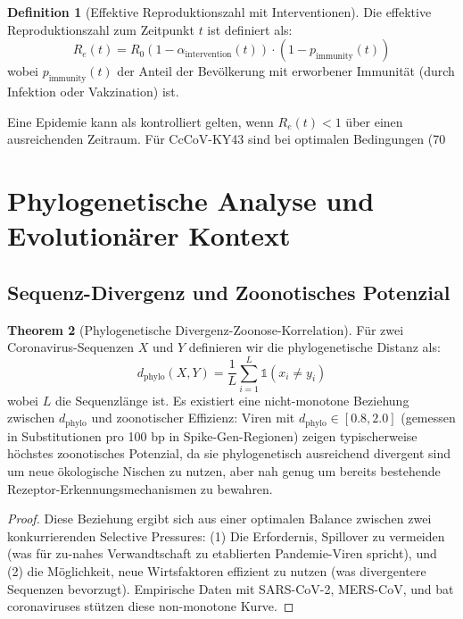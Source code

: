 \documentclass[11pt,a4paper]{article}
\theoremstyle{definition}
\newtheorem{theorem}{Theorem}[section]
\newtheorem{definition}[theorem]{Definition}
\begin{document}
\begin{definition}[Effektive Reproduktionszahl mit Interventionen]
Die effektive Reproduktionszahl zum Zeitpunkt $t$ ist definiert als:
\[
R_e(t) = R_0 (1 - \alpha_{\text{intervention}}(t)) \cdot (1 - p_{\text{immunity}}(t))
\]
wobei $p_{\text{immunity}}(t)$ der Anteil der Bevölkerung mit erworbener Immunität (durch Infektion oder Vakzination) ist.
\end{definition}

Eine Epidemie kann als kontrolliert gelten, wenn $R_e(t) < 1$ über einen ausreichenden Zeitraum. Für CcCoV-KY43 sind bei optimalen Bedingungen (70%

\section{Phylogenetische Analyse und Evolutionärer Kontext}

\subsection{Sequenz-Divergenz und Zoonotisches Potenzial}

\begin{theorem}[Phylogenetische Divergenz-Zoonose-Korrelation]
\label{thm:phylo_zoonosis}
Für zwei Coronavirus-Sequenzen $X$ und $Y$ definieren wir die phylogenetische Distanz als:
\[
d_{\text{phylo}}(X, Y) = \frac{1}{L} \sum_{i=1}^{L} \mathbb{1}(x_i \neq y_i)
\]
wobei $L$ die Sequenzlänge ist. Es existiert eine nicht-monotone Beziehung zwischen $d_{\text{phylo}}$ und zoonotischer Effizienz: Viren mit $d_{\text{phylo}} \in [0.8, 2.0]$ (gemessen in Substitutionen pro 100 bp in Spike-Gen-Regionen) zeigen typischerweise höchstes zoonotisches Potenzial, da sie phylogenetisch ausreichend divergent sind um neue ökologische Nischen zu nutzen, aber nah genug um bereits bestehende Rezeptor-Erkennungsmechanismen zu bewahren.
\end{theorem}

\begin{proof}
Diese Beziehung ergibt sich aus einer optimalen Balance zwischen zwei konkurrierenden Selective Pressures: (1) Die Erfordernis, Spillover zu vermeiden (was für zu-nahes Verwandtschaft zu etablierten Pandemie-Viren spricht), und (2) die Möglichkeit, neue Wirtsfaktoren effizient zu nutzen (was divergentere Sequenzen bevorzugt). Empirische Daten mit SARS-CoV-2, MERS-CoV, und bat coronaviruses stützen diese non-monotone Kurve.
\end{proof}
\end{document}

